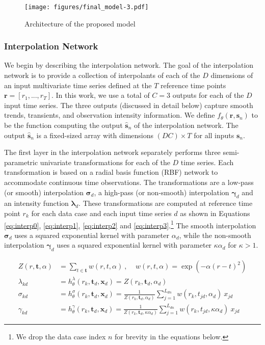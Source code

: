 \documentclass{article} \usepackage{iclr2019_conference,times}
\newcommand{\mbf}[1]{\mathbf{#1}}
\begin{document}
\begin{figure}[t]
\texttt{[image: figures/final\_model-3.pdf]}
\centering
\caption{Architecture of the proposed model}
\label{fig:model}
\end{figure}

\subsubsection{Interpolation Network} We begin by describing the interpolation network. 
The goal of the interpolation network is to provide a collection of interpolants 
of each of the $D$ dimensions of an input multivariate time series defined at the 
$T$ reference time points $\mbf{r}=[r_1,...,r_T]$. In this work, we use a total
of $C=3$ outputs for each of the 
$D$ input time series. The three outputs (discussed in detail below) capture smooth trends, transients, and observation intensity information. We define $f_{\theta}(\mbf{r},\mbf{s}_n)$ to be the function computing the output $\hat{\mathbf{s}}_n$ of the interpolation network. The output $\hat{\mathbf{s}}_n$ is a fixed-sized array with dimensions $(DC)\times T$ for all inputs $\mbf{s}_n$.

The first layer in the interpolation network separately performs three semi-parametric 
univariate transformations for each of the $D$ time series. Each transformation
is based on a radial basis function (RBF) network to accommodate continuous time observations. The transformations are
a low-pass (or smooth) interpolation $\bm{\sigma}_{d}$, a high-pass (or non-smooth) interpolation $\bm{\gamma}_{d}$ and an intensity function $\bm{\lambda}_{d}$. These transformations are computed at reference time point $r_k$ for each data case and each input time series $d$ as shown in Equations \ref{eq:interp0}, \ref{eq:interp1}, \ref{eq:interp2} and \ref{eq:interp3}.\footnote{We drop the data case index $n$ for brevity in the equations below.} The smooth interpolation $\bm{\sigma}_{d}$ uses a squared exponential kernel with  parameter $\alpha_d$, while the non-smooth interpolation $\bm{\gamma}_{d}$ uses a squared exponential kernel with parameter
$\kappa \alpha_d$ for $\kappa>1$. 

\vspace{-1mm}
\begin{align}
\label{eq:interp0}
Z(r, \mbf{t}, \alpha) &= \sum_{t \in \mbf{t}} w(r,t, \alpha)  \:, \:\:\:\:\: w(r,t,\alpha) = \exp(-\alpha(r-t)^2)\\	
 \label{eq:interp1}
\lambda_{kd} &=  h_\theta^\lambda(r_k, \mbf{t}_d, \mbf{x}_d) = Z(r_k, \mbf{t}_d, \alpha_d)\\ 
\label{eq:interp2}
\sigma_{kd} &= h_\theta^\sigma(r_k, \mbf{t}_d, \mbf{x}_d) = \frac{1}{Z(r_k, \mbf{t}_d, \alpha_d)}  {\displaystyle \sum_{j=1}^{L_{dn}} w(r_k,t_{jd}, \alpha
_d) \:x_{jd}} \\
 \label{eq:interp3}
\gamma_{kd} &= h_\theta^\gamma(r_k, \mbf{t}_d, \mbf{x}_d) = \frac{1}{Z(r_k, \mbf{t}_d,\kappa \alpha_d)}  {\displaystyle \sum_{j=1}^{L_{dn}} w(r_k,t_{jd}, \kappa\alpha_d) \:x_{jd}} 
\end{align}
\end{document}
